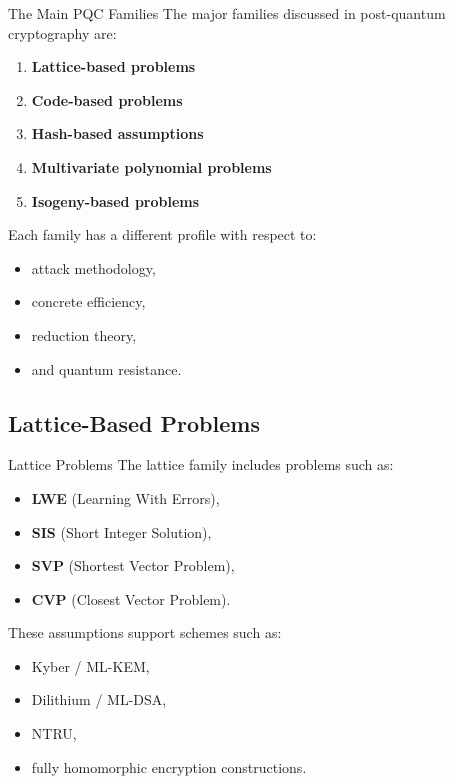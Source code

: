\documentclass[aspectratio=169]{beamer}
\begin{document}
	\begin{frame}{The Main PQC Families}
		The major families discussed in post-quantum cryptography are:
		\begin{enumerate}
			\item \textbf{Lattice-based problems}
			\item \textbf{Code-based problems}
			\item \textbf{Hash-based assumptions}
			\item \textbf{Multivariate polynomial problems}
			\item \textbf{Isogeny-based problems}
		\end{enumerate}
		
		\vspace{0.5em}
		Each family has a different profile with respect to:
		\begin{itemize}
			\item attack methodology,
			\item concrete efficiency,
			\item reduction theory,
			\item and quantum resistance.
		\end{itemize}
	\end{frame}
	
	\subsection{Lattice-Based Problems}
	
	\begin{frame}{Lattice Problems}
		The lattice family includes problems such as:
		\begin{itemize}
			\item \textbf{LWE} (Learning With Errors),
			\item \textbf{SIS} (Short Integer Solution),
			\item \textbf{SVP} (Shortest Vector Problem),
			\item \textbf{CVP} (Closest Vector Problem).
		\end{itemize}
		
		\vspace{0.5em}
		These assumptions support schemes such as:
		\begin{itemize}
			\item Kyber / ML-KEM,
			\item Dilithium / ML-DSA,
			\item NTRU,
			\item fully homomorphic encryption constructions.
		\end{itemize}
	\end{frame}
	
\end{document}
